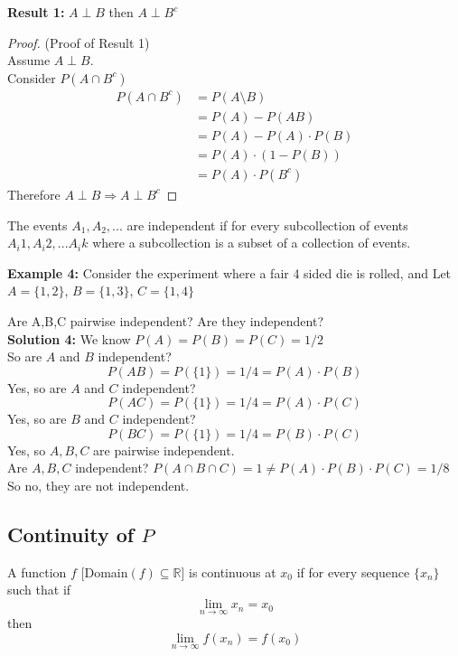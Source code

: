 \documentclass[12pt, twoside]{article}
\begin{document}
\textbf{Result 1:} $A \perp B$ then $A \perp B^c$
\begin{proof} (Proof of Result 1)\\
	Assume $A \perp B$.\\
	Consider $P(A \cap B^c)$
	\begin{align*}
		P(A \cap B^c) &= P(A \setminus B)\\
		&= P(A) - P(AB)\\
		&= P(A) - P(A) \cdot P(B)\\
		&= P(A) \cdot (1 - P(B))\\
		&= P(A) \cdot P(B^c)
	\end{align*}
	Therefore $A \perp B \Longrightarrow A \perp B^c$
\end{proof}

\begin{tcolorbox}[title=Definition: General Definition of Independent Events]
	The events $A_1, A_2, ...$ are independent if for every subcollection of events $A_i1, A_i2, ... A_ik$ where a subcollection is a subset of a collection of events.
\end{tcolorbox}

\textbf{Example 4:} Consider the experiment where a fair 4 sided die is rolled, and Let $A = \{ 1,2 \}$, $B = \{ 1,3 \}$, $C = \{ 1,4 \}$

Are A,B,C pairwise independent? Are they independent?
\\
\textbf{Solution 4:} We know $P(A) = P(B) = P(C) = 1/2$\\
So are $A$ and $B$ independent?
$$P(AB) = P(\{ 1 \}) = 1/4 = P(A)\cdot P(B)$$
Yes, so are $A$ and $C$ independent?
$$P(AC) = P(\{ 1 \}) = 1/4 = P(A)\cdot P(C)$$
Yes, so are $B$ and $C$ independent?
$$P(BC) = P(\{ 1 \}) = 1/4 = P(B)\cdot P(C)$$
Yes, so $A, B, C$ are pairwise independent.\\
Are $A,B,C$ independent?
$P(A\cap B \cap C) = 1 \neq P(A) \cdot P(B) \cdot P(C) = 1/8$
So no, they are not independent.

\subsection{Continuity of $P$}

\begin{tcolorbox}[title=Definition: Continuous]
	A function $f$ [Domain$(f) \subseteq \mathbb{R}$] is continuous at $x_0$ if for every sequence $\{x_n\}$ such that if $$\lim_{n\to\infty} x_n = x_0$$ then $$\lim_{n\to\infty} f(x_n) = f(x_0)$$
\end{tcolorbox}
\end{document}
